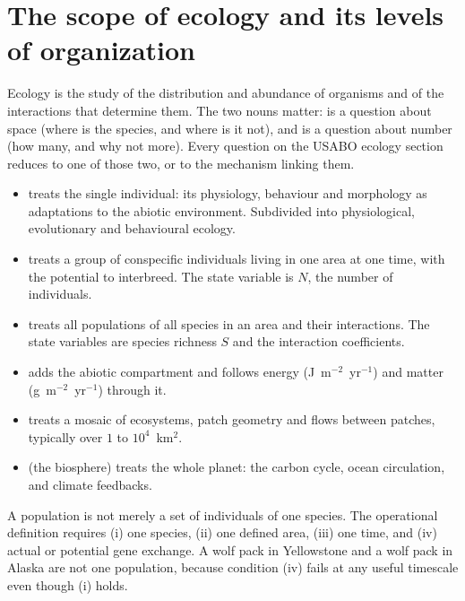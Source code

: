 
\section{The scope of ecology and its levels of organization}

Ecology is the study of the distribution and abundance of organisms and of the
interactions that determine them. The two nouns matter:  is a
question about space (where is the species, and where is it not), and
 is a question about number (how many, and why not more). Every
question on the USABO ecology section reduces to one of those two, or to the
mechanism linking them.

\begin{defbox}[title={DEFINITIONS: the levels of ecological organization}]
\begin{itemize}
\item {} treats the single individual: its physiology,
behaviour and morphology as adaptations to the abiotic environment. Subdivided
into physiological, evolutionary and behavioural ecology.
\item {} treats a group of conspecific individuals living in
one area at one time, with the potential to interbreed. The state variable is
$N$, the number of individuals.
\item {} treats all populations of all species in an area and
their interactions. The state variables are species richness $S$ and the
interaction coefficients.
\item {} adds the abiotic compartment and follows energy
(J~m$^{-2}$~yr$^{-1}$) and matter (g~m$^{-2}$~yr$^{-1}$) through it.
\item {} treats a mosaic of ecosystems, patch geometry and
flows between patches, typically over $1$ to $10^4$~km$^2$.
\item {} (the biosphere) treats the whole planet: the carbon
cycle, ocean circulation, and climate feedbacks.
\end{itemize}
\end{defbox}

A population is not merely a set of individuals of one species. The operational
definition requires (i) one species, (ii) one defined area, (iii) one time, and
(iv) actual or potential gene exchange. A wolf pack in Yellowstone and a wolf
pack in Alaska are not one population, because condition (iv) fails at any useful
timescale even though (i) holds.

